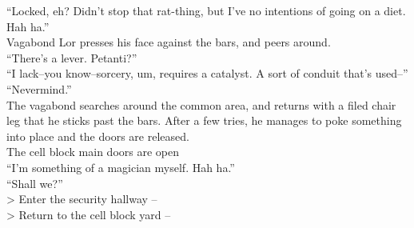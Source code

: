 “Locked, eh? Didn’t stop that rat-thing, but I’ve no intentions of going on a diet. Hah ha.”\\

Vagabond Lor presses his face against the bars, and peers around.\\
“There’s a lever. Petanti?”\\

“I lack--you know--sorcery, um, requires a catalyst. A sort of conduit that’s used--”\\

“Nevermind.”\\
The vagabond searches around the common area, and returns with a filed chair leg that he sticks past the bars. After a few tries, he manages to poke something into place and the doors are released.\\
 The cell block main doors are open\\

“I’m something of a magician myself. Hah ha.”\\

“Shall we?”\\

> Enter the security hallway -- \\
> Return to the cell block yard -- 